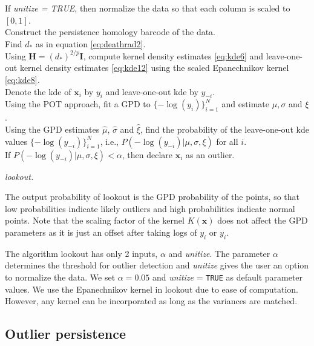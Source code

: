 \documentclass[11pt,a4paper,]{article}
\theoremstyle{definition}
\theoremstyle{definition}
\theoremstyle{definition}
\theoremstyle{remark}
\begin{document}
\DontPrintSemicolon
\begin{algorithm}\fontsize{11}{16}\selectfont
    If \textit{unitize = TRUE}, then normalize the data so that each column is scaled to $[0,1]$.\\
    Construct the persistence homology barcode of the data. \\
    Find $d_*$ as in equation \eqref{eq:deathrad2}. \\
    Using $\bm{H} = (d_*)^{2/p}\bm{I}$, compute kernel density estimates \eqref{eq:kde6} and leave-one-out kernel density estimates \eqref{eq:kde12} using the scaled Epanechnikov kernel \eqref{eq:kde8}. \\
    Denote the kde of $\bm{x}_i$ by $y_i$ and leave-one-out kde by $y_{-i}$.\\
    Using the POT approach, fit a GPD to $\{-\log(y_i)\}_{i=1}^N$ and estimate $\mu, \sigma$ and $\xi$. \\
    Using the GPD estimates $\hat\mu$, $\hat\sigma$ and $\hat\xi$, find the probability of the leave-one-out kde values $\{-\log(y_{-i})\}_{i=1}^N$, i.e., $P\left(-\log(y_{-i})|\mu, \sigma, \xi \right)$ for all $i$. \\
    If $P\left(-\log(y_{-i})|\mu, \sigma, \xi \right) < \alpha$, then declare $\bm{x}_i$ as an outlier.
    \caption{\itshape lookout.}
    \label{algo:lookout}
\end{algorithm}

The output probability of lookout is the GPD probability of the points, so that low probabilities indicate likely outliers and high probabilities indicate normal points. Note that the scaling factor of the kernel \(K(\bm{x})\) does not affect the GPD parameters as it is just an offset after taking logs of \(y_i\) or \(y_i\).

The algorithm lookout has only 2 inputs, \(\alpha\) and \emph{unitize}. The parameter \(\alpha\) determines the threshold for outlier detection and \emph{unitize} gives the user an option to normalize the data. We set \(\alpha= 0.05\) and \emph{unitize} = \texttt{TRUE} as default parameter values. We use the Epanechnikov kernel in lookout due to ease of computation. However, any kernel can be incorporated as long as the variances are matched.

\hypertarget{subsec:persistence}{%
\subsection{Outlier persistence}\label{subsec:persistence}}
\end{document}
